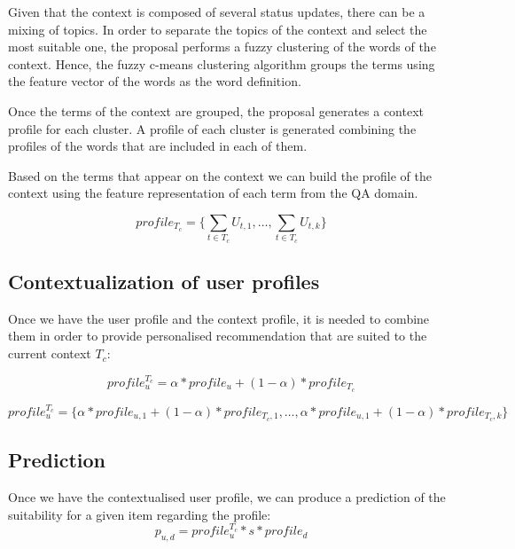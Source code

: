\documentclass[preprint]{elsarticle}
\begin{document}
\begin{spacing}{1.5}
Given that the context is composed of several status updates, there can be a mixing of topics. In order to separate the topics of the context and select the most suitable one, the proposal performs a fuzzy clustering of the words of the context. Hence, the fuzzy c-means clustering algorithm groups the terms using the feature vector of the words as the word definition.

Once the terms of the context are grouped, the proposal generates a context profile for each cluster. A profile of each cluster is generated combining the profiles of the words that are included in each of them.

Based on the terms that appear on the context we can build the profile of the context using the feature representation of each term from the QA domain.

\begin{equation}
	profile_{T_c} = \{\sum_{t \in T_c} U_{t,1}, \dots, \sum_{t \in T_c} U_{t,k} \}
\end{equation}

\subsection{Contextualization of user profiles}

Once we have the user profile and the context profile, it is needed to combine them in order to provide personalised recommendation that are suited to the current context $T_c$:

\begin{equation}
	profile_u^{T_c} = \alpha * profile_u + (1- \alpha )*profile_{T_c}
\end{equation}

\begin{equation}
	profile_u^{T_c} = \{ \alpha * profile_{u,1} + (1- \alpha ) * profile_{T_c,1},\dots, \alpha * profile_{u,1} + ( 1 - \alpha ) * profile_{T_c,k} \}
\end{equation}

\subsection{Prediction}

Once we have the contextualised user profile, we can produce a prediction of the suitability for a given item regarding the profile:
\begin{equation}
	p_{u,d} = profile_u^{T_c}*s*profile_d
\end{equation}


\end{spacing}
\end{document}
